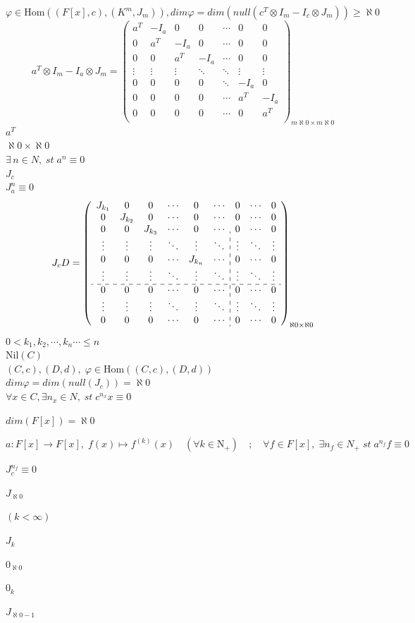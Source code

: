 \documentclass{article}
\numberwithin{equation}{subsection}
\begin{document}
$\varphi  \in \mathrm{Hom}\left((F{[x]},c),(K^m,J_m)\right), dim\varphi=dim(null(c^T\otimes I_m-I_c\otimes J_m))\geq \aleph 0$\\
$$
a^T\otimes I_m-I_a\otimes J_m=
\begin{pmatrix}
    a^T&-I_a&0&0&\cdots&0&0\\
    0&a^T&-I_a&0&\cdots&0&0\\
    0&0&a^T&-I_a&\cdots&0&0\\
    \vdots&\vdots&\vdots&\ddots&\ddots&\vdots&\vdots\\
    0&0&0&0&\ddots&-I_a&0\\
    0&0&0&0&\cdots&a^T&-I_a\\
    0&0&0&0&\cdots&0&a^T\\
\end{pmatrix}_{m\aleph 0 \times m\aleph 0 }
$$
$a^T$\\
$\aleph 0 \times \aleph 0$\\
$\exists\, n\in N, \;st\;a^n\equiv 0$\\
$J_c$\\
$J_a^n\equiv 0$
$$
J_cD=
\left(
    \begin{array}{cccccc :ccc}
    J_{k_1}&0&0&\cdots&0&\cdots&0&\cdots&0\\
    0&J_{k_2}&0&\cdots&0&\cdots&0&\cdots&0\\
    0&0&J_{k_3}&\cdots&0&\cdots&0&\cdots&0\\
    \vdots&\vdots&\vdots&\ddots&\vdots&\ddots&\vdots&\ddots&\vdots\\
    0&0&0&\cdots&J_{k_n}&\cdots&0&\cdots&0\\
    \vdots&\vdots&\vdots&\ddots&\vdots&\ddots&\vdots&\ddots&\vdots\\\hdashline
    0&0&0&\cdots&0&\cdots&0&\cdots&0\\
    \vdots&\vdots&\vdots&\ddots&\vdots&\ddots&\vdots&\ddots&\vdots\\
    0&0&0&\cdots&0&\cdots&0&\cdots&0
    \end{array}
\right)_{\aleph 0 \times \aleph 0 }
$$
$0<k_1,k_2,\cdots,k_n\cdots \leq n$\\
$\mathrm{Nil}(C)$\\
$(C,c),(D,d),\; \varphi \in\mathrm{Hom}\left((C,c),(D,d)\right)$
\\
$dim\varphi=dim(null(J_c))=\aleph 0$\\
$\forall x\in C,\exists n_x\in N,\;st\;c^{n_x}x\equiv 0$

$dim(F[x])=\aleph 0$

$a:F[x]\longrightarrow F[x],\;f(x)\longmapsto f^{(k)}(x)\quad(\forall k\in \mathrm{N_+})\quad;\quad \forall f\in F[x],\;\exists n_f\in N_+ \;st\;a^{n_f}f\equiv 0$

$J_c^{n_f}\equiv 0$

$J_{\aleph 0}$

$(k<\infty)$

$J_k$

$0_{\aleph 0}$

$0_k$

$J_{\aleph 0-1}$
\end{document}
